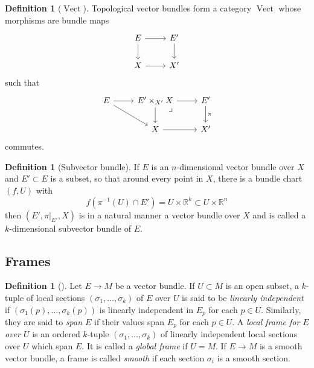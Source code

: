 \documentclass[reqno]{amsart}
\theoremstyle{definition}
\newtheorem{definition}[theorem]{Definition}
\theoremstyle{remark}
\DeclareMathOperator{\Vect}{Vect}
\begin{document}
    \begin{definition}[$\Vect$]
        Topological vector bundles form a category $\Vect$
        whose morphisms are
        bundle maps
         \begin{equation*}
        \begin{tikzcd}
            E \ar[d] \ar[r] & E' \ar[d] \\
            X \ar[r] & X'
        \end{tikzcd}
        \end{equation*}
        such that
    \begin{equation*}
    \begin{tikzcd}
        E \ar[r] \ar[dr] & E' \times_{X'} X \ar[r]
        \ar[d] \ar[dr, phantom, "\lrcorner", very near start] & E'
        \ar[d, "\pi"] \\
                                       & X \ar[r] & X'
    \end{tikzcd}
    \end{equation*}
    commutes.
    \end{definition}

    \begin{definition}[Subvector bundle]
        If $E$ is an $n$-dimensional vector bundle over
        $X$ and $E' \subset E$ is a subset, so that around every
        point in $X$, there is a bundle chart
        $\left( f, U \right) $ with
        \[
        f\left( \pi^{-1}(U) \cap E' \right) 
        = U \times \mathbb{R}^{k} \subset U \times \mathbb{R}^{n}
        \] 
        then $\left( E', \pi|_{E'},X \right) $ 
        is in a natural manner a vector bundle over
        $X$ and is called a $k$-dimensional
        subvector bundle of $E$.
    \end{definition}

    \subsection{Frames}

    \begin{definition}[]
        Let $E \to M$ be a vector bundle.
        If $U \subset M$ is an open subset, a 
        $k$-tuple of local sections
        $\left( \sigma_1, \ldots, \sigma_k \right) $ of $E$ 
        over $U$ is said to be \textit{linearly independent} if
        $\left( \sigma_1 (p), \ldots, \sigma_k(p) \right) $ 
        is linearly independent in $E_p$ for each
        $p \in U$. Similarly, they are said to
        \textit{span $E$ } if their values span
        $E_p$ for each $p \in U$. 
        A \textit{local frame for $E$ over $U$ } is an ordered
        $k$-tuple $\left( \sigma_1, \ldots, \sigma_k \right) $ 
        of linearly independent local sections over $U$ which
        span $E$. It is called a \textit{global frame} if
        $U = M$.
        If $E \to M$ is a smooth vector bundle, a frame
        is called \textit{smooth} if each section
        $\sigma_i$ is a smooth section.
    \end{definition}
\end{document}
